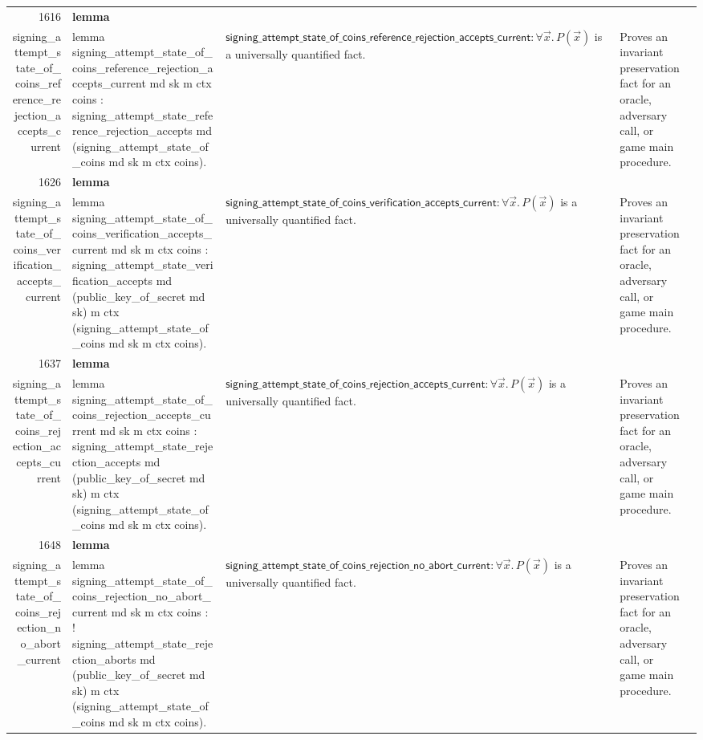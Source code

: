 \documentclass[10pt]{article}
\newcommand{\ec}[1]{\begingroup\ttfamily\scriptsize #1\endgroup}
\begin{document}
\begin{longtable}{r L{0.17\textwidth} L{0.26\textwidth} L{0.27\textwidth} L{0.20\textwidth}}
1616 & \textbf{lemma}\\\ec{signing\_attempt\_state\_of\_coins\_reference\_rejection\_accepts\_current} & \ec{lemma signing\_attempt\_state\_of\_coins\_reference\_rejection\_accepts\_current md sk m ctx coins : signing\_attempt\_state\_reference\_rejection\_accepts md (signing\_attempt\_state\_of\_coins md sk m ctx coins).} & \(\mathsf{signing\_attempt\_state\_of\_coins\_reference\_rejection\_accepts\_current} : \forall \vec{x}.\, P(\vec{x})\) is a universally quantified fact. & Proves an invariant preservation fact for an oracle, adversary call, or game main procedure. \\
1626 & \textbf{lemma}\\\ec{signing\_attempt\_state\_of\_coins\_verification\_accepts\_current} & \ec{lemma signing\_attempt\_state\_of\_coins\_verification\_accepts\_current md sk m ctx coins : signing\_attempt\_state\_verification\_accepts md (public\_key\_of\_secret md sk) m ctx (signing\_attempt\_state\_of\_coins md sk m ctx coins).} & \(\mathsf{signing\_attempt\_state\_of\_coins\_verification\_accepts\_current} : \forall \vec{x}.\, P(\vec{x})\) is a universally quantified fact. & Proves an invariant preservation fact for an oracle, adversary call, or game main procedure. \\
1637 & \textbf{lemma}\\\ec{signing\_attempt\_state\_of\_coins\_rejection\_accepts\_current} & \ec{lemma signing\_attempt\_state\_of\_coins\_rejection\_accepts\_current md sk m ctx coins : signing\_attempt\_state\_rejection\_accepts md (public\_key\_of\_secret md sk) m ctx (signing\_attempt\_state\_of\_coins md sk m ctx coins).} & \(\mathsf{signing\_attempt\_state\_of\_coins\_rejection\_accepts\_current} : \forall \vec{x}.\, P(\vec{x})\) is a universally quantified fact. & Proves an invariant preservation fact for an oracle, adversary call, or game main procedure. \\
1648 & \textbf{lemma}\\\ec{signing\_attempt\_state\_of\_coins\_rejection\_no\_abort\_current} & \ec{lemma signing\_attempt\_state\_of\_coins\_rejection\_no\_abort\_current md sk m ctx coins : ! signing\_attempt\_state\_rejection\_aborts md (public\_key\_of\_secret md sk) m ctx (signing\_attempt\_state\_of\_coins md sk m ctx coins).} & \(\mathsf{signing\_attempt\_state\_of\_coins\_rejection\_no\_abort\_current} : \forall \vec{x}.\, P(\vec{x})\) is a universally quantified fact. & Proves an invariant preservation fact for an oracle, adversary call, or game main procedure. \\

\end{longtable}
\end{document}
